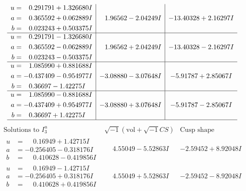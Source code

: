 \documentclass[1p]{elsarticle_modified}
\theoremstyle{definition}
\newcommand{\I}{\sqrt{-1}}
\begin{document}
$$\begin{array}{c|c|c}
\begin{aligned}
u &= \phantom{-}0.291791 + 1.326680 I \\
a &= \phantom{-}0.365592 + 0.062889 I \\
b &= \phantom{-}0.023243 + 0.503375 I\end{aligned}
 & \phantom{-}1.96562 - 2.04249 I & -13.40328 + 2.16297 I \\ \hline\begin{aligned}
u &= \phantom{-}0.291791 - 1.326680 I \\
a &= \phantom{-}0.365592 - 0.062889 I \\
b &= \phantom{-}0.023243 - 0.503375 I\end{aligned}
 & \phantom{-}1.96562 + 2.04249 I & -13.40328 - 2.16297 I \\ \hline\begin{aligned}
u &= \phantom{-}1.085990 + 0.881688 I \\
a &= -0.437409 - 0.954977 I \\
b &= \phantom{-}0.36697 - 1.42275 I\end{aligned}
 & -3.08880 - 3.07648 I & -5.91787 + 2.85067 I \\ \hline\begin{aligned}
u &= \phantom{-}1.085990 - 0.881688 I \\
a &= -0.437409 + 0.954977 I \\
b &= \phantom{-}0.36697 + 1.42275 I\end{aligned}
 & -3.08880 + 3.07648 I & -5.91787 - 2.85067 I\\
 \hline 
 \end{array}$$\newpage$$\begin{array}{c|c|c}  
\text{Solutions to }I^u_{3}& \I (\text{vol} + \sqrt{-1}CS) & \text{Cusp shape}\\
 \hline 
\begin{aligned}
u &= \phantom{-}0.16949 + 1.42715 I \\
a &= -0.256405 - 0.318176 I \\
b &= \phantom{-}0.410628 - 0.419856 I\end{aligned}
 & \phantom{-}4.55049 - 5.52863 I & -2.59452 + 8.92048 I \\ \hline\begin{aligned}
u &= \phantom{-}0.16949 - 1.42715 I \\
a &= -0.256405 + 0.318176 I \\
b &= \phantom{-}0.410628 + 0.419856 I\end{aligned}
 & \phantom{-}4.55049 + 5.52863 I & -2.59452 - 8.92048 I \\ \hline\begin{aligned}

\end{aligned}
\end{array}$$
\end{document}
